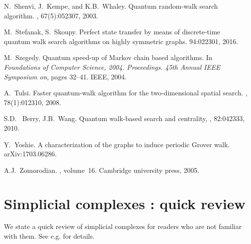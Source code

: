 \documentclass[a4paper,12pt]{article}
\numberwithin{equation}{section}
\begin{document}
\begin{thebibliography}{99}
N.~Shenvi, J.~Kempe, and K.B.~Whaley.
\newblock Quantum random-walk search algorithm.
, 67(5):052307, 2003.

M.~Stefanak, S.~Skoupy. 
\newblock Perfect state transfer by means of discrete-time quantum walk search algorithms on highly symmetric graphs.
 94:022301, 2016.

M.~Szegedy.
\newblock Quantum speed-up of {M}arkov chain based algorithms.
\newblock In {\em Foundations of Computer Science, 2004. Proceedings. 45th
  Annual IEEE Symposium on}, pages 32--41. IEEE, 2004.

A.~Tulsi.
\newblock Faster quantum-walk algorithm for the two-dimensional spatial search.
, 78(1):012310, 2008.

S.D.~ Berry, J.B.~Wang.
\newblock Quantum walk-based search and centrality, 
, 82:042333, 2010.

Y.~Yoshie.
\newblock A characterization of the graphs to induce periodic Grover walk.
\newblock arXiv:1703.06286. 

A.J.~Zomorodian.
, volume~16.
\newblock Cambridge university press, 2005.

\end{thebibliography}







\appendix
\section{Simplicial complexes : quick review}
\label{appendix-cpx}

We state a quick review of simplicial complexes for readers who are not familiar with them. See e.g. \cite{Z2005} for details.

\end{document}
